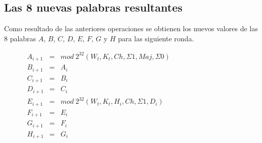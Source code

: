 \documentclass{article}
\begin{document}
    \subsection{Las 8 nuevas palabras resultantes}
        Como resultado de las anteriores operaciones se obtienen los nuevos valores de las 8 palabras $A$, $B$, $C$, $D$, $E$, $F$, $G$ y $H$ para las siguiente ronda.
            \begin{figure}[H]
            \centering
                $\begin{array}{lcl}
                    A_{i+1} & = & mod \ 2^{32} (W_{t}, K_{t}, Ch, \Sigma1, Maj, \Sigma0) \\
                    B_{i+1} & = &  A_{i} \\
                    C_{i+1} & = &  B_{i} \\
                    D_{i+1} & = &  C_{i} \\
                    E_{i+1} & = &  mod \ 2^{32} (W_{t}, K_{t}, H_{i}, Ch, \Sigma1, D_{i}) \\
                    F_{i+1} & = &  E_{i} \\
                    G_{i+1} & = &  F_{i} \\
                    H_{i+1} & = &  G_{i} \\
                \end{array}$
            \end{figure}
        
\end{document}
